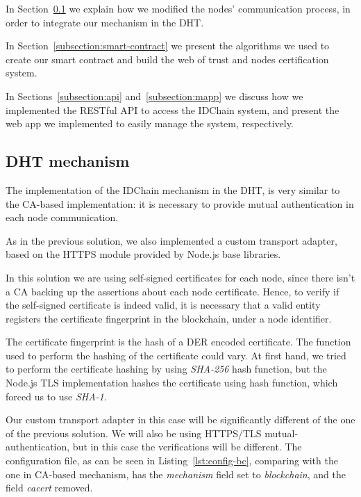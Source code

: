 In Section~\ref{subsection:dht-mechanism} we explain how we modified the nodes' communication process, in order to integrate our mechanism in the DHT.

In Section~\ref{subsection:smart-contract} we present the algorithms we used to create our smart contract and build the web of trust and nodes certification system.

In Sections~\ref{subsection:api} and~\ref{subsection:mapp} we discuss how we implemented the RESTful API to access the IDChain system, and present the web app we implemented to easily manage the system, respectively.

\subsection{DHT mechanism}\label{subsection:dht-mechanism}

The implementation of the IDChain mechanism in the DHT, is very similar to the CA-based implementation: it is necessary to provide mutual authentication in each node communication.

As in the previous solution, we also implemented a custom transport adapter, based on the HTTPS module provided by Node.js base libraries.

In this solution we are using self-signed certificates for each node, since there isn't a CA backing up the assertions about each node certificate.
Hence, to verify if the self-signed certificate is indeed valid, it is necessary that a valid entity registers the certificate fingerprint in the blockchain, under a node identifier.

The certificate fingerprint is the hash of a \ac{DER} encoded certificate. The function used to perform the hashing of the certificate could vary.
At first hand, we tried to perform the certificate hashing by using \textit{SHA-256} hash function, but the Node.js TLS implementation hashes the certificate using  hash function, which forced us to use \textit{SHA-1}.

Our custom transport adapter in this case will be significantly different of the one of the previous solution.
We will also be using HTTPS/TLS mutual-authentication, but in this case the verifications will be different.
The configuration file, as can be seen in Listing~\ref{lst:config-bc}, comparing with the one in CA-based mechanism, has the \textit{mechanism} field set to \textit{blockchain}, and the field \textit{cacert} removed.



